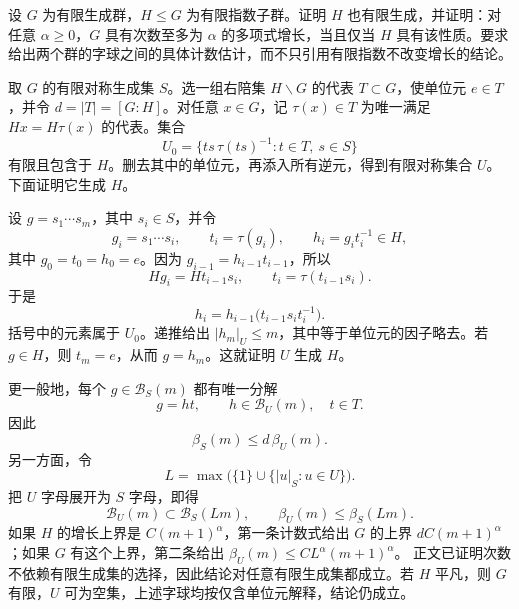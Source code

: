 \begin{exercise}\label{g3:ex:finite-index-word-growth}
	设 \(G\) 为有限生成群，\(H\le G\) 为有限指数子群。证明 \(H\) 也有限生成，并证明：对任意 \(\alpha\ge0\)，\(G\) 具有次数至多为 \(\alpha\) 的多项式增长，当且仅当 \(H\) 具有该性质。要求给出两个群的字球之间的具体计数估计，而不只引用有限指数不改变增长的结论。
\end{exercise}
\begin{solution}
	取 \(G\) 的有限对称生成集 \(S\)。选一组右陪集 \(H\backslash G\) 的代表 \(T\subset G\)，使单位元 \(e\in T\)，并令 \(d=|T|=[G:H]\)。对任意 \(x\in G\)，记 \(\tau(x)\in T\) 为唯一满足 \(Hx=H\tau(x)\) 的代表。集合
	\[
		U_0=\{ts\,\tau(ts)^{-1}:t\in T,\ s\in S\}
	\]
	有限且包含于 \(H\)。删去其中的单位元，再添入所有逆元，得到有限对称集合 \(U\)。下面证明它生成 \(H\)。

	设 \(g=s_1\cdots s_m\)，其中 \(s_i\in S\)，并令
	\[
		g_i=s_1\cdots s_i,\qquad
		t_i=\tau(g_i),\qquad
		h_i=g_it_i^{-1}\in H,
	\]
	其中 \(g_0=t_0=h_0=e\)。因为 \(g_{i-1}=h_{i-1}t_{i-1}\)，所以
	\[
		Hg_i=Ht_{i-1}s_i,
		\qquad t_i=\tau(t_{i-1}s_i).
	\]
	于是
	\[
		h_i=h_{i-1}
		\bigl(t_{i-1}s_it_i^{-1}\bigr).
	\]
	括号中的元素属于 \(U_0\)。递推给出 \(|h_m|_U\le m\)，其中等于单位元的因子略去。若 \(g\in H\)，则 \(t_m=e\)，从而 \(g=h_m\)。这就证明 \(U\) 生成 \(H\)。

	更一般地，每个 \(g\in\mathcal B_S(m)\) 都有唯一分解
	\[
		g=ht,\qquad h\in\mathcal B_U(m),\quad t\in T.
	\]
	因此
	\[
		\beta_S(m)\le d\,\beta_U(m).
	\]
	另一方面，令
	\[
		L=\max\bigl(\{1\}\cup\{|u|_S:u\in U\}\bigr).
	\]
	把 \(U\) 字母展开为 \(S\) 字母，即得
	\[
		\mathcal B_U(m)\subset\mathcal B_S(Lm),
		\qquad \beta_U(m)\le\beta_S(Lm).
	\]
	如果 \(H\) 的增长上界是 \(C(m+1)^\alpha\)，第一条计数式给出 \(G\) 的上界 \(dC(m+1)^\alpha\)；如果 \(G\) 有这个上界，第二条给出
	\(\beta_U(m)\le CL^\alpha(m+1)^\alpha\)。
	正文已证明次数不依赖有限生成集的选择，因此结论对任意有限生成集都成立。若 \(H\) 平凡，则 \(G\) 有限，\(U\) 可为空集，上述字球均按仅含单位元解释，结论仍成立。
\end{solution}

